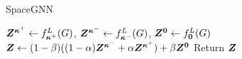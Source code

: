 \IncMargin{1em}
\vspace{-2mm}
\begin{algorithm}[H]
\caption{SpaceGNN}\label{alg:spacegnn}
$\boldsymbol{Z}^{\boldsymbol{\kappa}^+}\leftarrow f_{\boldsymbol{\kappa}^+}^L(G)$, $\boldsymbol{Z}^{\boldsymbol{\kappa}^-}\leftarrow f_{\boldsymbol{\kappa}^-}^L(G)$, $\boldsymbol{Z}^{\boldsymbol{0}}\leftarrow f_{\boldsymbol{0}}^L(G)$\;
$\boldsymbol{Z}\leftarrow (1-\beta)((1-\alpha)\boldsymbol{Z}^{\boldsymbol{\kappa}^-}+\alpha\boldsymbol{Z}^{\boldsymbol{\kappa}^+})+\beta\boldsymbol{Z}^{\boldsymbol{0}}$\;
Return $\boldsymbol{Z}$\;

\end{algorithm}
\vspace{-2mm}
\DecMargin{1em}